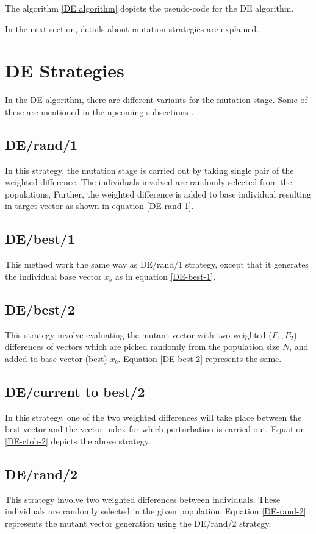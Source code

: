 The algorithm \ref{DE algorithm} depicts the pseudo-code for the DE algorithm.


In the next section, details about mutation strategies are explained. 

\section{DE Strategies}
In the DE algorithm, there are different variants for the mutation stage. Some of these are mentioned in the upcoming subsections \cite{chi}.

\subsection{DE/rand/1}
In this strategy, the mutation stage is carried out by taking single pair of the weighted difference. The individuals involved are randomly selected from the populations, Further, the weighted difference is added to base individual resulting in target vector as shown in equation \ref{DE-rand-1}.

\subsection{DE/best/1}
This method work the same way as DE/rand/1 strategy, except that it generates the individual base vector $x_{b}$ as in equation \ref{DE-best-1}.


\subsection{DE/best/2}
This strategy involve evaluating the mutant vector with two weighted ($F_1, F_2$) differences of vectors which are picked randomly from the population size \(N\), and added to base vector (best) \(x_b\). Equation \ref{DE-best-2} represents the same.


\subsection{DE/current to best/2}
In this strategy, one of the two weighted differences will take place between the best vector and the vector index for which perturbation is carried out. Equation \ref{DE-ctob-2} depicts the above strategy. 


\subsection{DE/rand/2}
This strategy involve two weighted differences between individuals. These individuals are randomly selected in the given population. Equation \ref{DE-rand-2} represents the mutant vector generation using the DE/rand/2 strategy. 



